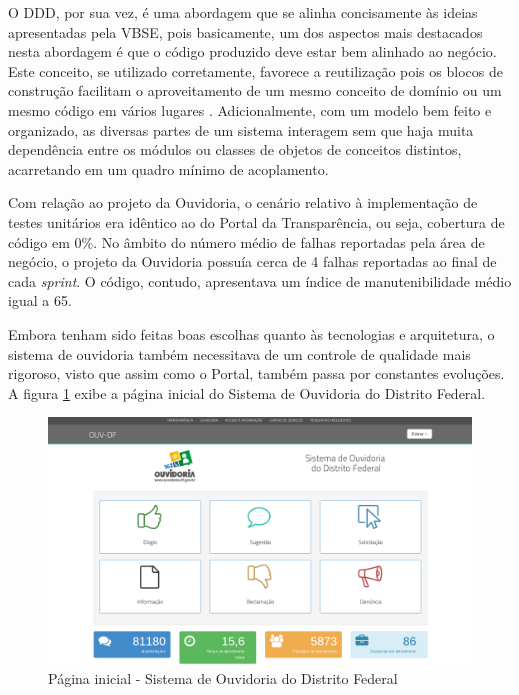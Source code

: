 O DDD, por sua vez, é uma abordagem que se alinha concisamente às ideias apresentadas pela VBSE, pois basicamente, um dos aspectos mais destacados nesta abordagem é que o código produzido deve estar bem alinhado ao negócio. Este conceito, se utilizado corretamente, favorece a reutilização pois os blocos de construção facilitam o aproveitamento de um mesmo conceito de domínio ou um mesmo código em vários lugares \cite{ddd}. Adicionalmente, com um modelo bem feito e organizado, as diversas partes de um sistema interagem sem que haja muita dependência entre os módulos ou classes de objetos de conceitos distintos, acarretando em um quadro mínimo de acoplamento.

Com relação ao projeto da Ouvidoria, o cenário relativo à implementação de testes unitários era idêntico ao do Portal da Transparência, ou seja, cobertura de código em 0\%. No âmbito do número médio de falhas reportadas pela área de negócio, o projeto da Ouvidoria possuía cerca de 4 falhas reportadas ao final de cada \textit{sprint}. O código, contudo, apresentava um índice de manutenibilidade médio igual a 65.

Embora tenham sido feitas boas escolhas quanto às tecnologias e arquitetura, o sistema de ouvidoria também necessitava de um controle de qualidade mais rigoroso, visto que assim como o Portal, também passa por constantes evoluções. A figura \ref{fig:inicioOuvdf} exibe a página inicial do Sistema de Ouvidoria do Distrito Federal.

\begin{figure}[h]
\includegraphics[width=\textwidth]{figuras/sistemaOuvidoria.png}
\caption{Página inicial - Sistema de Ouvidoria do Distrito Federal}
\label{fig:inicioOuvdf}
\end{figure}

\clearpage

